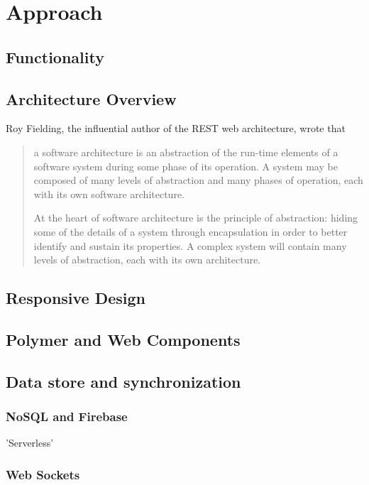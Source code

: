 \chapter{Approach}
%

\section{Functionality}

\section{Architecture Overview}
Roy Fielding, the influential author of the REST web architecture, wrote that

\begin{quote}
a software architecture is an abstraction of the run-time elements of a software system during some phase of its operation. A system may be composed of many levels of abstraction and many phases of operation, each with its own software architecture.

At the heart of software architecture is the principle of abstraction: hiding some of the details of a system through encapsulation in order to better identify and sustain its properties. A complex system will contain many levels of abstraction, each with its own architecture.~\cite{fielding2000}
\end{quote}


\section{Responsive Design}

\section{Polymer and Web Components}

\section{Data store and synchronization}
\subsection{NoSQL and Firebase}

'Serverless'

\subsection{Web Sockets}

